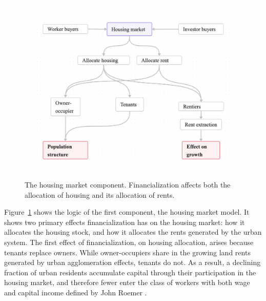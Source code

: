 
\begin{figure}[!ht]
\centering
\includegraphics[scale=.20]{fig/flow-impacts.png}
\caption[The housing market component of the model]{The housing market component. Financialization affects both the allocation of housing and its allocation of rents.}
\label{fig-impacts}
\end{figure}

Figure~\ref{fig-impacts} shows the logic of the first component, the housing market model.
It shows two primary effects financialization has on the housing market: how it allocates
the housing stock, and how it allocates the \glspl{rent} generated by the urban system. 
The first effect of financialization, on housing allocation, arises because tenants replace owners. While owner-occupiers share in the growing land rents generated by urban agglomeration effects, tenants do not. As a result, a declining fraction of urban residents accumulate capital through their participation in the housing market, and therefore fewer enter the class of workers with both wage and capital income defined by John Roemer \cite{roemerGeneralTheoryExploitation1982}. 

